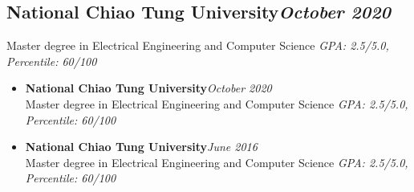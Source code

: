 \iftrue
\iffalse
\section{Education}
\large{\textbf{National Chiao Tung University}}\hfill \small{\textit{October 2020}}\\
\small{Master degree in Electrical Engineering and Computer Science}\hfill
\small{\textit{GPA: 2.5/5.0, Percentile: 60/100}}\\
\noindent
\large{\textbf{National Chiao Tung University}}\hfill \small{\textit{October 2020}}\\
\small{Master degree in Electrical Engineering and Computer Science}\hfill
\small{\textit{GPA: 2.5/5.0, Percentile: 60/100}}
\fi

\iftrue
\iffalse
\subsection{
\textbf{National Chiao Tung University}\hfill \textmd{\small{\textit{October 2020}}}}
\small{Master degree in Electrical Engineering and Computer Science}\hfill
\small{\textit{GPA: 2.5/5.0, Percentile: 60/100}}

\begin{itemize}[leftmargin=0pt, label={}, itemsep=0pt]

\item{
{\sectionheading\large{\textbf{National Chiao Tung University}}}\hfill {\sectionheading\small{\textit{October 2020}}}\\
{\sectionheading\small{Master degree in Electrical Engineering and Computer Science}}\hfill
{\sectionheading\small{\textit{GPA: 2.5/5.0, Percentile: 60/100}}}\\

}
\item{
{\sectionheading\large{\textbf{National Chiao Tung University}}}\hfill \small{\textit{June 2016}}\\
\small{Master degree in Electrical Engineering and Computer Science}\hfill
\small{\textit{GPA: 2.5/5.0, Percentile: 60/100}}
}

\end{itemize}

